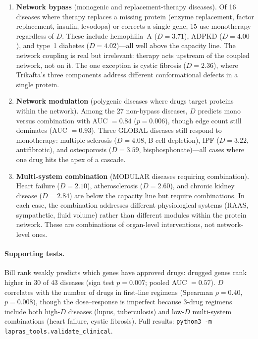 \documentclass[11pt,a4paper]{article}
\begin{document}
\begin{enumerate}
\item \textbf{Network bypass} (monogenic and replacement-therapy diseases). Of 16 diseases where therapy replaces a missing protein (enzyme replacement, factor replacement, insulin, levodopa) or corrects a single gene, 15 use monotherapy regardless of $D$. These include hemophilia~A ($D = 3.71$), ADPKD ($D = 4.00$), and type~1 diabetes ($D = 4.02$)---all well above the capacity line. The network coupling is real but irrelevant: therapy acts upstream of the coupled network, not on it. The one exception is cystic fibrosis ($D = 2.36$), where Trikafta's three components address different conformational defects in a single protein.

\item \textbf{Network modulation} (polygenic diseases where drugs target proteins within the network). Among the 27 non-bypass diseases, $D$ predicts mono versus combination with AUC $= 0.84$ ($p = 0.006$), though edge count still dominates (AUC $= 0.93$). Three GLOBAL diseases still respond to monotherapy: multiple sclerosis ($D = 4.08$, B-cell depletion), IPF ($D = 3.22$, antifibrotic), and osteoporosis ($D = 3.59$, bisphosphonate)---all cases where one drug hits the apex of a cascade.

\item \textbf{Multi-system combination} (MODULAR diseases requiring combination). Heart failure ($D = 2.10$), atherosclerosis ($D = 2.60$), and chronic kidney disease ($D = 2.84$) are below the capacity line but require combinations. In each case, the combination addresses different physiological systems (RAAS, sympathetic, fluid volume) rather than different modules within the protein network. These are combinations of organ-level interventions, not network-level ones.
\end{enumerate}

\paragraph{Supporting tests.} Bill rank weakly predicts which genes have approved drugs: drugged genes rank higher in 30 of 43 diseases (sign test $p = 0.007$; pooled AUC $= 0.57$). $D$ correlates with the number of drugs in first-line regimens (Spearman $\rho = 0.40$, $p = 0.008$), though the dose--response is imperfect because 3-drug regimens include both high-$D$ diseases (lupus, tuberculosis) and low-$D$ multi-system combinations (heart failure, cystic fibrosis). Full results: \texttt{python3 -m lapras\_tools.validate\_clinical}.
\end{document}
